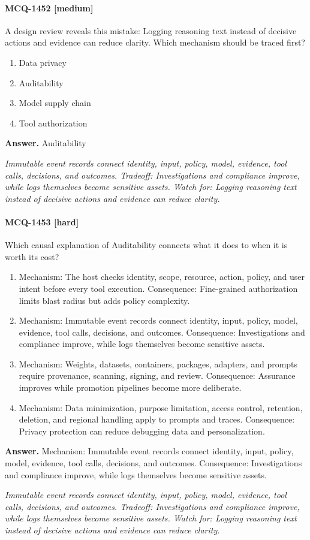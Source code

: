 \paragraph{MCQ-1452 [medium]} A design review reveals this mistake: Logging reasoning text instead of decisive actions and evidence can reduce clarity. Which mechanism should be traced first?
\begin{enumerate}[label=\Alph*.]
\item Data privacy
\item Auditability
\item Model supply chain
\item Tool authorization
\end{enumerate}
\noindent\textbf{Answer.} Auditability
\par\textit{Immutable event records connect identity, input, policy, model, evidence, tool calls, decisions, and outcomes. Tradeoff: Investigations and compliance improve, while logs themselves become sensitive assets. Watch for: Logging reasoning text instead of decisive actions and evidence can reduce clarity.}
\paragraph{MCQ-1453 [hard]} Which causal explanation of Auditability connects what it does to when it is worth its cost?
\begin{enumerate}[label=\Alph*.]
\item Mechanism: The host checks identity, scope, resource, action, policy, and user intent before every tool execution. Consequence: Fine-grained authorization limits blast radius but adds policy complexity.
\item Mechanism: Immutable event records connect identity, input, policy, model, evidence, tool calls, decisions, and outcomes. Consequence: Investigations and compliance improve, while logs themselves become sensitive assets.
\item Mechanism: Weights, datasets, containers, packages, adapters, and prompts require provenance, scanning, signing, and review. Consequence: Assurance improves while promotion pipelines become more deliberate.
\item Mechanism: Data minimization, purpose limitation, access control, retention, deletion, and regional handling apply to prompts and traces. Consequence: Privacy protection can reduce debugging data and personalization.
\end{enumerate}
\noindent\textbf{Answer.} Mechanism: Immutable event records connect identity, input, policy, model, evidence, tool calls, decisions, and outcomes. Consequence: Investigations and compliance improve, while logs themselves become sensitive assets.
\par\textit{Immutable event records connect identity, input, policy, model, evidence, tool calls, decisions, and outcomes. Tradeoff: Investigations and compliance improve, while logs themselves become sensitive assets. Watch for: Logging reasoning text instead of decisive actions and evidence can reduce clarity.}
